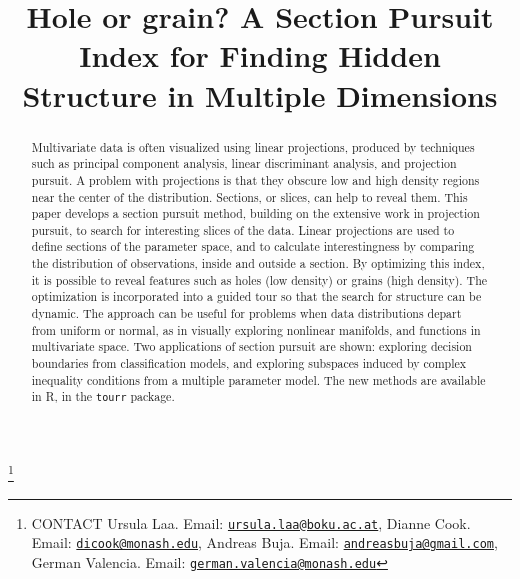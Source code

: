 \documentclass[]{interact}
\theoremstyle{plain}%
\theoremstyle{definition}
\theoremstyle{remark}
\begin{document}
\articletype{}

\title{Hole or grain? A Section Pursuit Index for Finding Hidden
Structure in Multiple Dimensions}


\author{
}

\thanks{CONTACT Ursula
Laa. Email: \href{mailto:ursula.laa@boku.ac.at}{\nolinkurl{ursula.laa@boku.ac.at}}, Dianne
Cook. Email: \href{mailto:dicook@monash.edu}{\nolinkurl{dicook@monash.edu}}, Andreas
Buja. Email: \href{mailto:andreasbuja@gmail.com}{\nolinkurl{andreasbuja@gmail.com}}, German
Valencia. Email: \href{mailto:german.valencia@monash.edu}{\nolinkurl{german.valencia@monash.edu}}}

\maketitle

\begin{abstract}
Multivariate data is often visualized using linear projections, produced
by techniques such as principal component analysis, linear discriminant
analysis, and projection pursuit. A problem with projections is that
they obscure low and high density regions near the center of the
distribution. Sections, or slices, can help to reveal them. This paper
develops a section pursuit method, building on the extensive work in
projection pursuit, to search for interesting slices of the data. Linear
projections are used to define sections of the parameter space, and to
calculate interestingness by comparing the distribution of observations,
inside and outside a section. By optimizing this index, it is possible
to reveal features such as holes (low density) or grains (high density).
The optimization is incorporated into a guided tour so that the search
for structure can be dynamic. The approach can be useful for problems
when data distributions depart from uniform or normal, as in visually
exploring nonlinear manifolds, and functions in multivariate space. Two
applications of section pursuit are shown: exploring decision boundaries
from classification models, and exploring subspaces induced by complex
inequality conditions from a multiple parameter model. The new methods
are available in R, in the \texttt{tourr} package.
\end{abstract}
\end{document}
